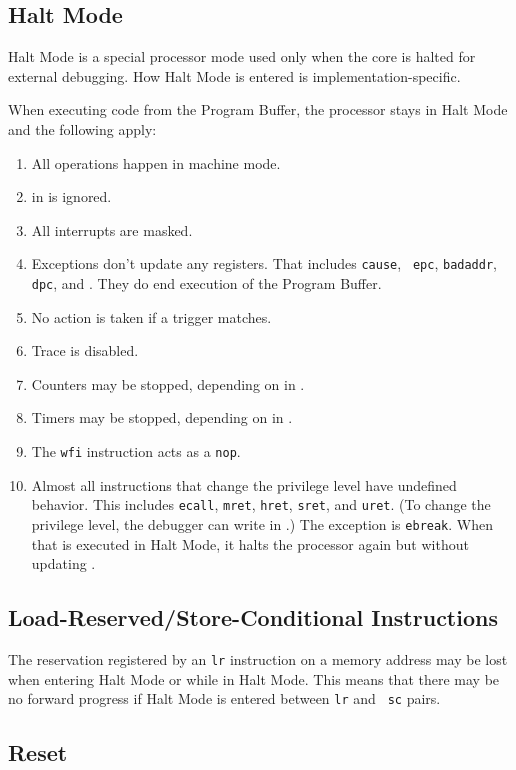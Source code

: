 \documentclass{article}
\newenvironment{steps}[1]
{
   \vspace{1ex}
   \noindent
   #1
   \begin{enumerate}[nosep]
}
{
   \end{enumerate}
   \vspace{1ex}
}
\begin{document}
\subsection{Halt Mode} \label{haltmode}

Halt Mode is a special processor mode used only when the core is halted for
external debugging. How Halt Mode is entered is implementation-specific.

\begin{steps}{When executing code from the Program Buffer, the processor stays
    in Halt Mode and the following apply:}
\item All operations happen in machine mode.
\item \Fmprv in \Rmstatus is ignored.
\item All interrupts are masked.
\item Exceptions don't update any registers.  That includes {\tt cause}, {\tt
    epc}, {\tt badaddr}, {\tt dpc}, and \Rmstatus. They do end execution of the
    Program Buffer.
\item No action is taken if a trigger matches.
\item Trace is disabled.
\item Counters may be stopped, depending on \Fstopcount in \Rdcsr.
\item Timers may be stopped, depending on \Fstoptime in \Rdcsr.
\item The {\tt wfi} instruction acts as a {\tt nop}.
\item Almost all instructions that change the privilege level have undefined
    behavior.  This includes {\tt ecall}, {\tt mret}, {\tt hret}, {\tt sret},
    and {\tt uret}.  (To change the privilege level, the debugger can write
    \Fprv in \Rdcsr.) The exception is {\tt ebreak}. When that is executed in
    Halt Mode, it halts the processor again but without updating \Rdpc.
\end{steps}

\subsection{Load-Reserved/Store-Conditional Instructions}

The reservation registered by an {\tt lr} instruction on a memory address may
be lost when entering Halt Mode or while in Halt Mode.  This means that there
may be no forward progress if Halt Mode is entered between {\tt lr} and {\tt
sc} pairs.

\subsection{Reset}
\end{document}
